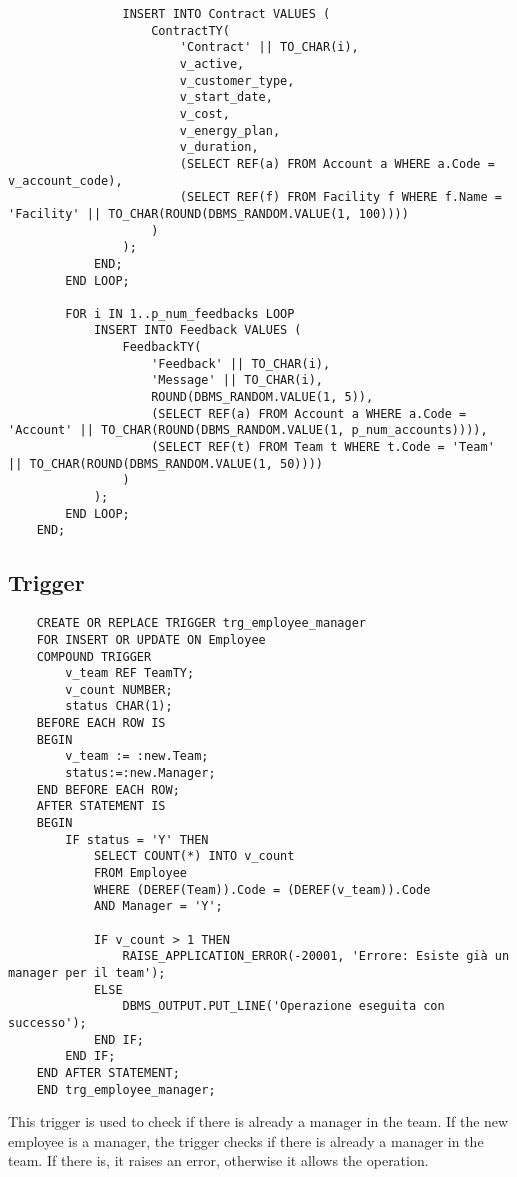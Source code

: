 \begin{lstlisting}
                INSERT INTO Contract VALUES (
                    ContractTY(
                        'Contract' || TO_CHAR(i),
                        v_active,  
                        v_customer_type, 
                        v_start_date,
                        v_cost,
                        v_energy_plan,
                        v_duration, 
                        (SELECT REF(a) FROM Account a WHERE a.Code = v_account_code),
                        (SELECT REF(f) FROM Facility f WHERE f.Name = 'Facility' || TO_CHAR(ROUND(DBMS_RANDOM.VALUE(1, 100))))
                    )
                );
            END;
        END LOOP;
    
        FOR i IN 1..p_num_feedbacks LOOP
            INSERT INTO Feedback VALUES (
                FeedbackTY(
                    'Feedback' || TO_CHAR(i),
                    'Message' || TO_CHAR(i),
                    ROUND(DBMS_RANDOM.VALUE(1, 5)),
                    (SELECT REF(a) FROM Account a WHERE a.Code = 'Account' || TO_CHAR(ROUND(DBMS_RANDOM.VALUE(1, p_num_accounts)))),
                    (SELECT REF(t) FROM Team t WHERE t.Code = 'Team' || TO_CHAR(ROUND(DBMS_RANDOM.VALUE(1, 50))))
                )
            );
        END LOOP;
    END;
\end{lstlisting}

\subsection{Trigger}

\begin{lstlisting}
    CREATE OR REPLACE TRIGGER trg_employee_manager
    FOR INSERT OR UPDATE ON Employee
    COMPOUND TRIGGER
        v_team REF TeamTY;
        v_count NUMBER;
        status CHAR(1);
    BEFORE EACH ROW IS
    BEGIN
        v_team := :new.Team;
        status:=:new.Manager;
    END BEFORE EACH ROW;
    AFTER STATEMENT IS
    BEGIN
        IF status = 'Y' THEN
            SELECT COUNT(*) INTO v_count
            FROM Employee
            WHERE (DEREF(Team)).Code = (DEREF(v_team)).Code
            AND Manager = 'Y';
    
            IF v_count > 1 THEN
                RAISE_APPLICATION_ERROR(-20001, 'Errore: Esiste già un manager per il team');
            ELSE
                DBMS_OUTPUT.PUT_LINE('Operazione eseguita con successo');
            END IF;
        END IF;
    END AFTER STATEMENT;
    END trg_employee_manager;
\end{lstlisting}

This trigger is used to check if there is already a manager in the team. If the new employee is a manager, the trigger checks if there is already a manager in the team. If there is, it raises an error, otherwise it allows the operation.


